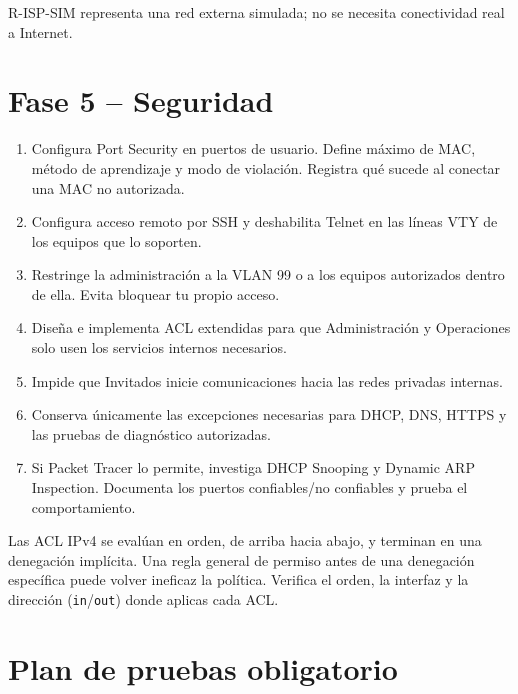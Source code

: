 \documentclass[12pt,a4paper]{article}
\begin{document}
R-ISP-SIM representa una red externa simulada; no se necesita conectividad real a Internet.

\section{Fase 5 -- Seguridad}
\begin{enumerate}[leftmargin=1.2cm]
 \item Configura Port Security en puertos de usuario. Define máximo de MAC, método de aprendizaje y modo de violación. Registra qué sucede al conectar una MAC no autorizada.
 \item Configura acceso remoto por SSH y deshabilita Telnet en las líneas VTY de los equipos que lo soporten.
 \item Restringe la administración a la VLAN 99 o a los equipos autorizados dentro de ella. Evita bloquear tu propio acceso.
 \item Diseña e implementa ACL extendidas para que Administración y Operaciones solo usen los servicios internos necesarios.
 \item Impide que Invitados inicie comunicaciones hacia las redes privadas internas.
 \item Conserva únicamente las excepciones necesarias para DHCP, DNS, HTTPS y las pruebas de diagnóstico autorizadas.
 \item Si Packet Tracer lo permite, investiga DHCP Snooping y Dynamic ARP Inspection. Documenta los puertos confiables/no confiables y prueba el comportamiento.
\end{enumerate}

\begin{alerta}
Las ACL IPv4 se evalúan en orden, de arriba hacia abajo, y terminan en una denegación implícita. Una regla general de permiso antes de una denegación específica puede volver ineficaz la política. Verifica el orden, la interfaz y la dirección (\texttt{in}/\texttt{out}) donde aplicas cada ACL.
\end{alerta}

\section{Plan de pruebas obligatorio}
\end{document}
